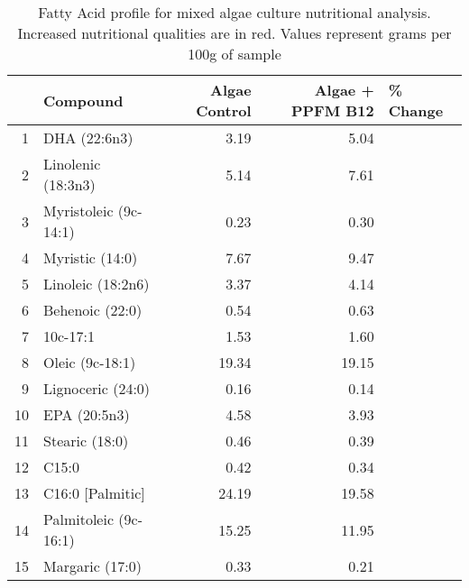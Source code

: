 \begin{table}[ht]
\centering
{\small
\begin{tabular}{rlrrl}
  \hline
 & Compound & Algae Control & Algae + PPFM B12 & \% Change \\ 
  \hline
1 & DHA (22:6n3) & 3.19 & 5.04 & \textbf{\color{red}{57.99}} \\ 
  2 & Linolenic (18:3n3) & 5.14 & 7.61 & \textbf{\color{red}{48.05}} \\ 
  3 & Myristoleic (9c-14:1) & 0.23 & 0.30 & \textbf{\color{red}{30.43}} \\ 
  4 & Myristic (14:0) & 7.67 & 9.47 & \textbf{\color{red}{23.47}} \\ 
  5 & Linoleic (18:2n6) & 3.37 & 4.14 & \textbf{\color{red}{22.85}} \\ 
  6 & Behenoic (22:0) & 0.54 & 0.63 & \textbf{\color{red}{16.67}} \\ 
  7 & 10c-17:1 & 1.53 & 1.60 & \textbf{\color{red}{4.58}} \\ 
  8 & Oleic (9c-18:1) & 19.34 & 19.15 & \textbf{\color{blue}{-0.98}} \\ 
  9 & Lignoceric (24:0) & 0.16 & 0.14 & \textbf{\color{blue}{-12.50}} \\ 
  10 & EPA (20:5n3) & 4.58 & 3.93 & \textbf{\color{blue}{-14.19}} \\ 
  11 & Stearic (18:0) & 0.46 & 0.39 & \textbf{\color{blue}{-15.22}} \\ 
  12 & C15:0 & 0.42 & 0.34 & \textbf{\color{blue}{-19.05}} \\ 
  13 & C16:0 [Palmitic] & 24.19 & 19.58 & \textbf{\color{blue}{-19.06}} \\ 
  14 & Palmitoleic (9c-16:1) & 15.25 & 11.95 & \textbf{\color{blue}{-21.64}} \\ 
  15 & Margaric (17:0) & 0.33 & 0.21 & \textbf{\color{blue}{-36.36}} \\ 
   \hline
\end{tabular}
}
\caption{Fatty Acid profile for mixed algae culture nutritional analysis. Increased nutritional qualities are in red. Values represent grams per 100g of sample} 
\label{tab:FattyAcids_trim}
\end{table}

